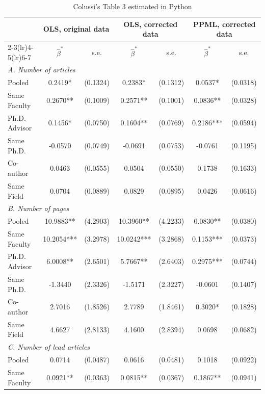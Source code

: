 \begin{table}[!htbp]
\renewcommand{\arraystretch}{0.95}
\centering
{}
\caption{Colussi's Table 3 estimated in Python}
\label{tab:python}
\footnotesize
\begin{tabular*}{\linewidth}{@{\extracolsep{\fill}}lcccccc}
\toprule
 & \multicolumn{2}{c}{OLS, original data} & \multicolumn{2}{c}{OLS, corrected data} & \multicolumn{2}{c}{PPML, corrected data} \\
\cmidrule(lr){2-3}\cmidrule(lr){4-5}\cmidrule(lr){6-7}
 & $\widehat{\beta}^\ast$ & s.e. & $\widehat{\beta}^\ast$ & s.e. & $\widehat{\beta}^\ast$ & s.e. \\
\midrule
\multicolumn{7}{l}{\textit{A. Number of articles}} \\[2pt]
\quad Pooled & 0.2419* & (0.1324) & 0.2383* & (0.1312) & 0.0537* & (0.0318) \\
\quad Same Faculty & 0.2670** & (0.1009) & 0.2571** & (0.1001) & 0.0836** & (0.0328) \\
\quad Ph.D. Advisor & 0.1456* & (0.0750) & 0.1604** & (0.0769) & 0.2186*** & (0.0594) \\
\quad Same Ph.D. & -0.0570 & (0.0749) & -0.0691 & (0.0753) & -0.0761 & (0.1195) \\
\quad Co-author & 0.0463 & (0.0555) & 0.0504 & (0.0550) & 0.1738 & (0.1633) \\
\quad Same Field & 0.0704 & (0.0889) & 0.0829 & (0.0895) & 0.0426 & (0.0616) \\[3pt]
\multicolumn{7}{l}{\textit{B. Number of pages}} \\[2pt]
\quad Pooled & 10.9883** & (4.2903) & 10.3960** & (4.2233) & 0.0830** & (0.0380) \\
\quad Same Faculty & 10.2054*** & (3.2978) & 10.0242*** & (3.2868) & 0.1153*** & (0.0373) \\
\quad Ph.D. Advisor & 6.0008** & (2.6501) & 5.7667** & (2.6403) & 0.2975*** & (0.0744) \\
\quad Same Ph.D. & -1.3440 & (2.3326) & -1.5171 & (2.3227) & -0.0601 & (0.1407) \\
\quad Co-author & 2.7016 & (1.8526) & 2.7789 & (1.8461) & 0.3020* & (0.1828) \\
\quad Same Field & 4.6627 & (2.8133) & 4.1600 & (2.8394) & 0.0698 & (0.0682) \\[3pt]
\multicolumn{7}{l}{\textit{C. Number of lead articles}} \\[2pt]
\quad Pooled & 0.0714 & (0.0487) & 0.0616 & (0.0481) & 0.1018 & (0.0922) \\
\quad Same Faculty & 0.0921** & (0.0363) & 0.0815** & (0.0367) & 0.1867** & (0.0941) \\

\end{tabular*}
\end{table}
